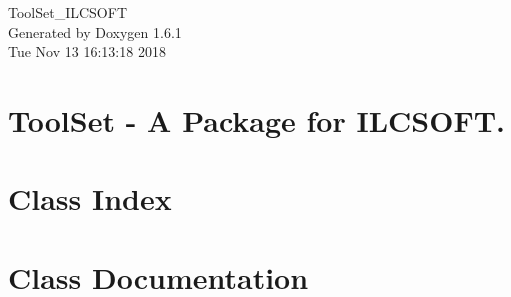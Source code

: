 \documentclass[a4paper]{book}
\begin{document}
\hypersetup{pageanchor=false}
\begin{titlepage}
\vspace*{7cm}
\begin{center}
{\Large ToolSet\_\-ILCSOFT }\\
\vspace*{1cm}
{\large Generated by Doxygen 1.6.1}\\
\vspace*{0.5cm}
{\small Tue Nov 13 16:13:18 2018}\\
\end{center}
\end{titlepage}
\clearemptydoublepage
{}
\tableofcontents
\clearemptydoublepage
{}
\hypersetup{pageanchor=true}
\chapter{ToolSet -\/ A Package for ILCSOFT.}
\label{index}\hypertarget{index}{}
\chapter{Class Index}

\chapter{Class Documentation}







\printindex
\end{document}
